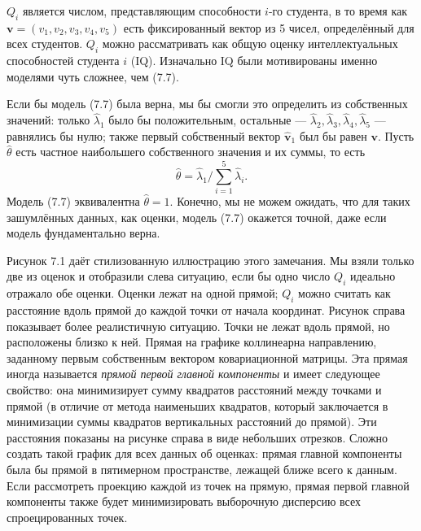 $Q_i$ является числом, представляющим способности $i$-го студента, в то время как $\mathbf v = (v_1,v_2,v_3,v_4,v_5)$ есть фиксированный вектор из 5 чисел, определённый для всех студентов. $Q_i$ можно рассматривать как общую оценку интеллектуальных способностей студента $i$ (IQ). Изначально IQ были мотивированы именно моделями чуть сложнее, чем (7.7).

Если бы модель (7.7) была верна, мы бы смогли это определить из собственных значений: только $\hat \lambda_1$ было бы положительным, остальные --- $\hat \lambda_2, \hat \lambda_3, \hat \lambda_4, \hat \lambda_5$ --- равнялись бы нулю; также первый собственный вектор $\hat{\mathbf v}_1$ был бы равен $\mathbf v$. Пусть $\hat \theta$ есть частное наибольшего собственного значения и их суммы, то есть
\begin{equation}
	\hat \theta = \hat \lambda_1 / \sum_{i = 1}^5 \hat \lambda_i.
\end{equation}
Модель (7.7) эквивалентна $\hat \theta = 1$. Конечно, мы не можем ожидать, что для таких зашумлённых данных, как оценки, модель (7.7) окажется точной, даже если модель фундаментально верна.

Рисунок 7.1 даёт стилизованную иллюстрацию этого замечания. Мы взяли только две из оценок и отобразили слева ситуацию, если бы одно число $Q_i$ идеально отражало обе оценки. Оценки лежат на одной прямой; $Q_i$ можно считать как расстояние вдоль прямой до каждой точки от начала координат. Рисунок справа показывает более реалистичную ситуацию. Точки не лежат вдоль прямой, но расположены близко к ней. Прямая на графике коллинеарна направлению, заданному первым собственным вектором ковариационной матрицы. Эта прямая иногда называется \textit{прямой первой главной компоненты} и имеет следующее свойство: она минимизирует сумму квадратов расстояний между точками и прямой (в отличие от метода наименьших квадратов, который заключается в минимизации суммы квадратов вертикальных расстояний до прямой). Эти расстояния показаны на рисунке справа в виде небольших отрезков. Сложно создать такой график для всех данных об оценках: прямая главной компоненты была бы прямой в пятимерном пространстве, лежащей ближе всего к данным. Если рассмотреть проекцию каждой из точек на прямую, прямая первой главной компоненты  также будет минимизировать выборочную дисперсию всех спроецированных точек.

